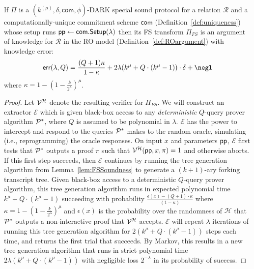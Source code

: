 \begin{theorem}
\label{thm:uniquefs}
	If $\Pi$ is a $(k^{(\mu)}, \delta, \textsf{com} , \phi)$-DARK special sound protocol for a relation $\mathcal{R}$ and a computationally-unique commitment scheme $\textsf{com}$ (Definition~\ref{def:uniqueness}) whose setup runs $\textsf{pp} \gets \textsf{com}.\textsf{{Setup}}(\lambda)$ then its FS transform $\Pi_{FS}$ is an argument of knowledge for $\mathcal{R}$ in the RO model (Definition~\ref{def:ROargument}) with knowledge error: 
	 $$\textsf{err}(\lambda, Q) = \frac{(Q+1)\kappa}{1- \kappa}  + 2\lambda (k^\mu + Q \cdot (k^\mu - 1)) \cdot \delta + \negl
 $$ where $\kappa = 1 - (1 - \frac{k}{2^\lambda})^\mu$.
	\end{theorem}
	\begin{proof}
	Let $\mathcal{V}^\mathcal{H}$ denote the resulting verifier for $\Pi_{FS}$. We will construct an extractor $\mathcal{E}$ which is given black-box access to any \emph{deterministic} $Q$-query prover algorithm $\mathcal{P}^*$, where $Q$ is assumed to be polynomial in $\lambda$. $\mathcal{E}$ has the power to intercept and respond to the queries $\mathcal{P}^*$ makes to the random oracle, simulating (i.e., reprogramming) the oracle responses. On input $x$ and parameters $\textsf{pp}$, $\mathcal{E}$ first tests that $\mathcal{P}^*$ outputs a proof $\pi$ such that $\mathcal{V}^\mathcal{H}(\textsf{pp}, x, \pi) = 1$ and otherwise aborts. If this first step succeeds, then $\mathcal{E}$ continues by running the tree generation algorithm from Lemma~\ref{lem:FSSoundness} to generate a $(k+1)$-ary forking transcript tree. Given black-box access to a deterministic $Q$-query prover algorithm, this tree generation algorithm runs in expected polynomial time $k^\mu + Q \cdot (k^\mu - 1)$ succeeding with probability $\frac{\epsilon(x) - (Q+1) \cdot \kappa }{(1 - \kappa)}$ where $\kappa = 1 - (1 - \frac{k}{2^\lambda})^\mu$ and $\epsilon(x)$ is the probability over the randomness of $\mathcal{H}$ that $\mathcal{P}^*$ outputs a non-interactive proof that $\mathcal{V}^\mathcal{H}$ accepts. $\mathcal{E}$ will repeat $\lambda$ iterations of running this tree generation algorithm for $2 (k^\mu + Q \cdot (k^\mu - 1))$  steps each time, and returns the first trial that succeeds. By Markov, this results in a new tree generation algorithm that runs in strict polynomial time $2\lambda (k^\mu + Q \cdot (k^\mu - 1))$ with negligible loss $2^{-\lambda}$ in its probability of success.
	

\end{proof}
